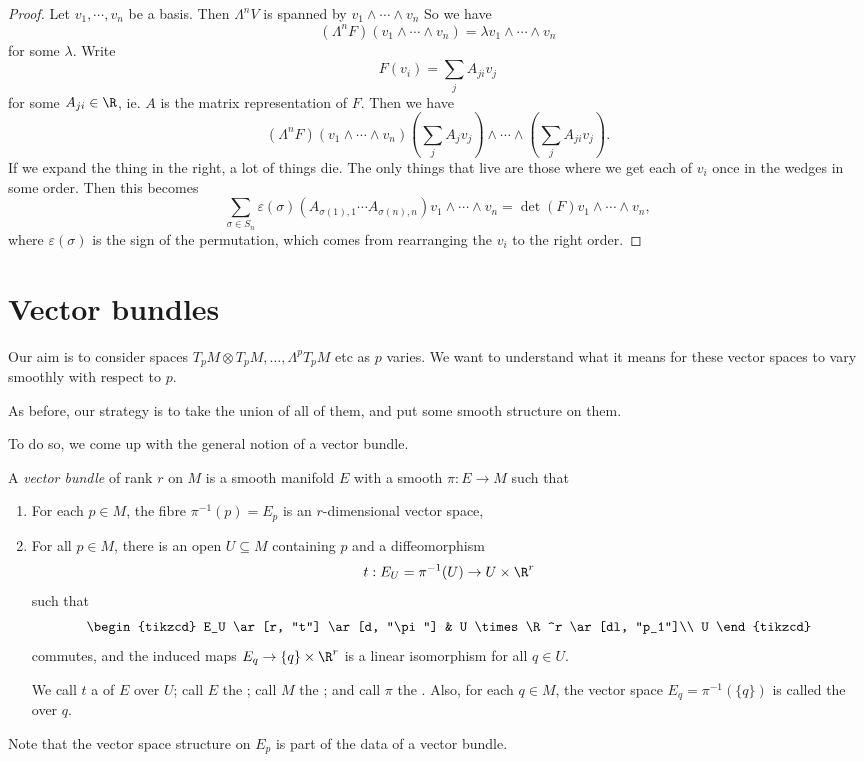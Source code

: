 \documentclass[a4paper]{article}
\begin{document}
\begin{proof}
  Let $v_1, \cdots, v_n$ be a basis. Then $\Lambda^n V$ is spanned by $v_1 \wedge \cdots \wedge v_n$ So we have
  \[
    (\Lambda^n F)(v_1\wedge \cdots \wedge v_n) = \lambda v_1 \wedge \cdots \wedge v_n
  \]
  for some $\lambda$. Write
  \[
    F(v_i) = \sum_j A_{ji} v_j
  \]
  for some $A_{ji} \in \R$, ie. $A$ is the matrix representation of $F$. Then we have
  \[
    (\Lambda^n F)(v_1 \wedge \cdots \wedge v_n) \left(\sum_j A_j v_j\right) \wedge \cdots \wedge \left(\sum_j A_{ji} v_j\right).
  \]
  If we expand the thing in the right, a lot of things die. The only things that live are those where we get each of $v_i$ once in the wedges in some order. Then this becomes
  \[
    \sum_{\sigma \in S_n} \varepsilon(\sigma) (A_{\sigma(1), 1} \cdots A_{\sigma(n), n}) v_1 \wedge \cdots \wedge v_n = \det(F) v_1 \wedge \cdots \wedge v_n,
  \]
  where $\varepsilon(\sigma)$ is the sign of the permutation, which comes from rearranging the $v_i$ to the right order.
\end{proof}

\section{Vector bundles}
Our aim is to consider spaces $T_p M \otimes T_p M, \ldots, \Lambda^p T_p M$ etc as $p$ varies. We want to understand what it means for these vector spaces to vary smoothly with respect to $p$.

As before, our strategy is to take the union of all of them, and put some smooth structure on them.

To do so, we come up with the general notion of a vector bundle.
\begin{defi}
  A \emph{vector bundle} of rank $r$ on $M$ is a smooth manifold $E$ with a smooth $\pi: E \to M$ such that
  \begin{enumerate}
    \item For each $p \in M$, the fibre $\pi^{-1}(p) = E_p$ is an $r$-dimensional vector space,
    \item For all $p \in M$, there is an open $U \subseteq M$ containing $p$ and a diffeomorphism
      \[
        t: E_U = \pi^{-1}(U) \to U \times \R^r
      \]
      such that
      \[
        \begin{tikzcd}
          E_U \ar[r, "t"] \ar[d, "\pi"] & U \times \R^r \ar[dl, "p_1"]\\
          U
        \end{tikzcd}
      \]
      commutes, and the induced maps $E_q \to \{q\} \times \R^r$ is a linear isomorphism for all $q \in U$.

      We call $t$ a  of $E$ over $U$; call $E$ the ; call $M$ the ; and call $\pi$ the . Also, for each $q \in M$, the vector space $E_q = \pi^{-1}(\{q\})$ is called the  over $q$.
  \end{enumerate}
  Note that the vector space structure on $E_p$ is part of the data of a vector bundle.
\end{defi}
\end{document}
